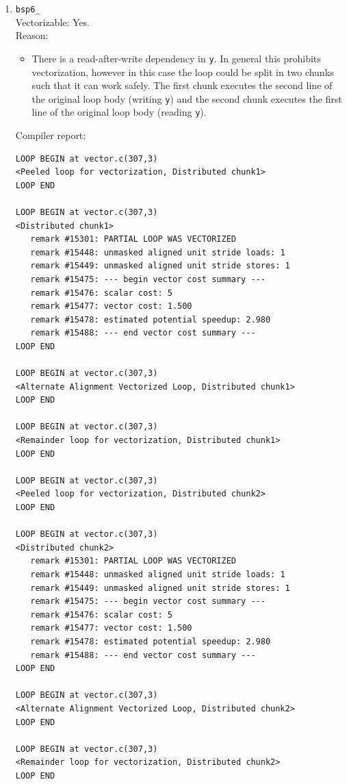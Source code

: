 \documentclass[11pt]{article}
\begin{document}
\begin{enumerate}
\item \texttt{bsp6\_}\\
Vectorizable: Yes.\\
Reason:
\begin{itemize}
\item There is a read-after-write dependency in \texttt{y}. In general this prohibits vectorization, however in this case the loop could be split in two chunks such that it can work safely. The first chunk executes the second line of the original loop body (writing \texttt{y}) and the second chunk executes the first line of the original loop body (reading \texttt{y}).
\end{itemize}
Compiler report:
\begin{lstlisting}
LOOP BEGIN at vector.c(307,3)
<Peeled loop for vectorization, Distributed chunk1>
LOOP END

LOOP BEGIN at vector.c(307,3)
<Distributed chunk1>
   remark #15301: PARTIAL LOOP WAS VECTORIZED
   remark #15448: unmasked aligned unit stride loads: 1 
   remark #15449: unmasked aligned unit stride stores: 1 
   remark #15475: --- begin vector cost summary ---
   remark #15476: scalar cost: 5 
   remark #15477: vector cost: 1.500 
   remark #15478: estimated potential speedup: 2.980 
   remark #15488: --- end vector cost summary ---
LOOP END

LOOP BEGIN at vector.c(307,3)
<Alternate Alignment Vectorized Loop, Distributed chunk1>
LOOP END

LOOP BEGIN at vector.c(307,3)
<Remainder loop for vectorization, Distributed chunk1>
LOOP END

LOOP BEGIN at vector.c(307,3)
<Peeled loop for vectorization, Distributed chunk2>
LOOP END

LOOP BEGIN at vector.c(307,3)
<Distributed chunk2>
   remark #15301: PARTIAL LOOP WAS VECTORIZED
   remark #15448: unmasked aligned unit stride loads: 1 
   remark #15449: unmasked aligned unit stride stores: 1 
   remark #15475: --- begin vector cost summary ---
   remark #15476: scalar cost: 5 
   remark #15477: vector cost: 1.500 
   remark #15478: estimated potential speedup: 2.980 
   remark #15488: --- end vector cost summary ---
LOOP END

LOOP BEGIN at vector.c(307,3)
<Alternate Alignment Vectorized Loop, Distributed chunk2>
LOOP END

LOOP BEGIN at vector.c(307,3)
<Remainder loop for vectorization, Distributed chunk2>
LOOP END
\end{lstlisting}


\end{enumerate}
\end{document}
